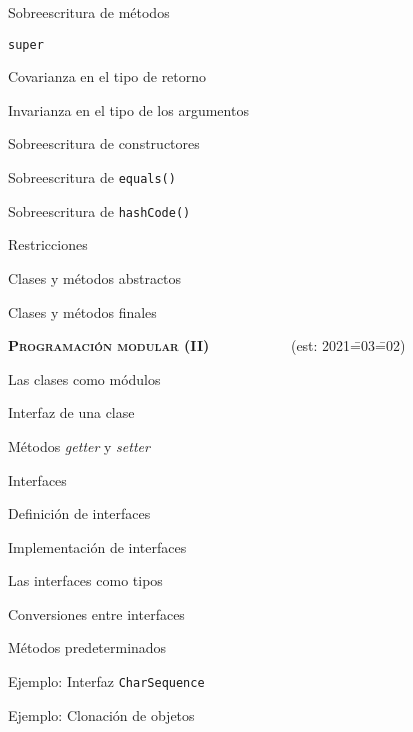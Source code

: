 \begin{longenum}
\begin{longenum}
\begin{longenum}
            \item Sobreescritura de métodos
            \begin{longenum}
                \item \texttt{super}
                \item Covarianza en el tipo de retorno
                \item Invarianza en el tipo de los argumentos
                \item Sobreescritura de constructores
                \item Sobreescritura de \texttt{equals()}
                \item Sobreescritura de \texttt{hashCode()}
            \end{longenum}
        \end{longenum}
        \item Restricciones
        \begin{longenum}
            \item Clases y métodos abstractos
            \item Clases y métodos finales
        \end{longenum}
    \end{longenum}
    \item \textbf{\textsc{Programación modular (II)}} \ \ \ \ \ \ \ \ \ \ \ (est: 2021\==03\==02)
    \begin{longenum}
        \item Las clases como módulos
        \begin{longenum}
            \item Interfaz de una clase
            \item Métodos \textit{getter} y \textit{setter}
        \end{longenum}
        \item Interfaces
        \begin{longenum}
            \item Definición de interfaces
            \item Implementación de interfaces
            \item Las interfaces como tipos
            \item Conversiones entre interfaces
            \item Métodos predeterminados
            \item Ejemplo: Interfaz \texttt{CharSequence}
            \item Ejemplo: Clonación de objetos

\end{longenum}
\end{longenum}
\end{longenum}

